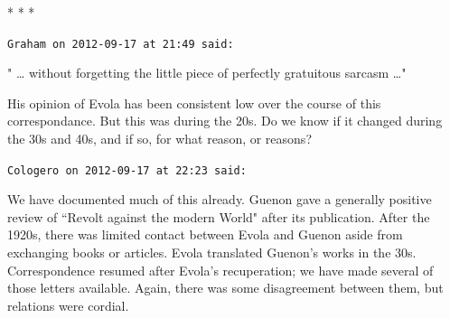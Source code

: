 
\begin{center}* * *\end{center}

\begin{footnotesize}\begin{sffamily}



\texttt{Graham on 2012-09-17 at 21:49 said: }

" … without forgetting the little piece of perfectly gratuitous sarcasm …"

His opinion of Evola has been consistent low over the course of this correspondance. But this was during the 20s. Do we know if it changed during the 30s and 40s, and if so, for what reason, or reasons?


\hfill

\texttt{Cologero on 2012-09-17 at 22:23 said: }

We have documented much of this already. Guenon gave a generally positive review of ``Revolt against the modern World" after its publication. After the 1920s, there was limited contact between Evola and Guenon aside from exchanging books or articles. Evola translated Guenon's works in the 30s. Correspondence resumed after Evola's recuperation; we have made several of those letters available. Again, there was some disagreement between them, but relations were cordial.


\end{sffamily}\end{footnotesize}
